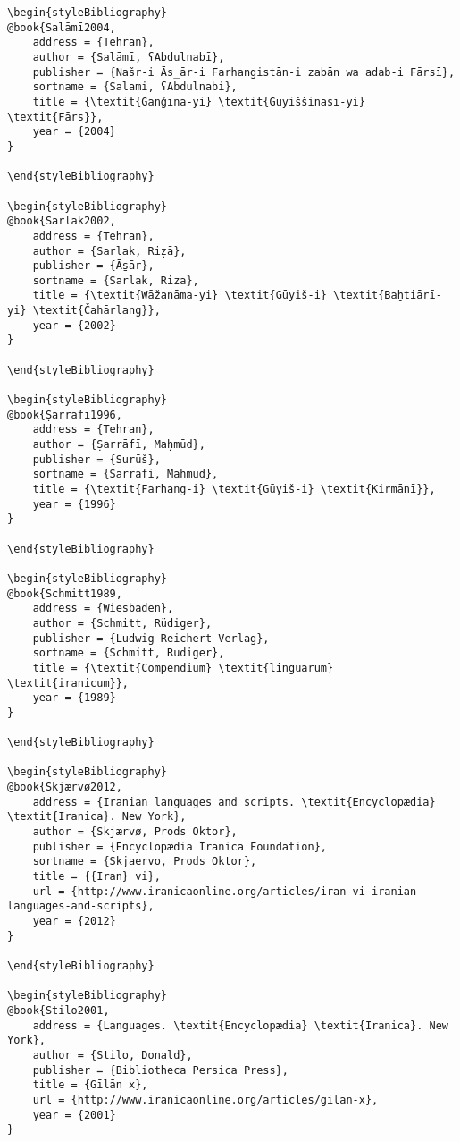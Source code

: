 \documentclass[output=paper]{langsci/langscibook}
\begin{document}
\begin{verbatim}
\begin{styleBibliography}
@book{Salāmī2004,
	address = {Tehran},
	author = {Salāmī, ʕAbdulnabī},
	publisher = {Našr-i Ās̲ār-i Farhangistān-i zabān wa adab-i Fārsī},
	sortname = {Salami, ʕAbdulnabi},
	title = {\textit{Ganǧīna-yi} \textit{Gūyiššināsī-yi} \textit{Fārs}},
	year = {2004}
}

\end{styleBibliography}

\begin{styleBibliography}
@book{Sarlak2002,
	address = {Tehran},
	author = {Sarlak, Riẓā},
	publisher = {Ās̱ār},
	sortname = {Sarlak, Riza},
	title = {\textit{Wāžanāma-yi} \textit{Gūyiš-i} \textit{Baḫtiārī-yi} \textit{Čahārlang}},
	year = {2002}
}

\end{styleBibliography}

\begin{styleBibliography}
@book{Ṣarrāfī1996,
	address = {Tehran},
	author = {Ṣarrāfī, Maḥmūd},
	publisher = {Surūš},
	sortname = {Sarrafi, Mahmud},
	title = {\textit{Farhang-i} \textit{Gūyiš-i} \textit{Kirmānī}},
	year = {1996}
}

\end{styleBibliography}

\begin{styleBibliography}
@book{Schmitt1989,
	address = {Wiesbaden},
	author = {Schmitt, Rüdiger},
	publisher = {Ludwig Reichert Verlag},
	sortname = {Schmitt, Rudiger},
	title = {\textit{Compendium} \textit{linguarum} \textit{iranicum}},
	year = {1989}
}

\end{styleBibliography}

\begin{styleBibliography}
@book{Skjærvø2012,
	address = {Iranian languages and scripts. \textit{Encyclopædia} \textit{Iranica}. New York},
	author = {Skjærvø, Prods Oktor},
	publisher = {Encyclopædia Iranica Foundation},
	sortname = {Skjaervo, Prods Oktor},
	title = {{Iran} vi},
	url = {http://www.iranicaonline.org/articles/iran-vi-iranian-languages-and-scripts},
	year = {2012}
}

\end{styleBibliography}

\begin{styleBibliography}
@book{Stilo2001,
	address = {Languages. \textit{Encyclopædia} \textit{Iranica}. New York},
	author = {Stilo, Donald},
	publisher = {Bibliotheca Persica Press},
	title = {Gīlān x},
	url = {http://www.iranicaonline.org/articles/gilan-x},
	year = {2001}
}


\end{verbatim}
\end{document}
